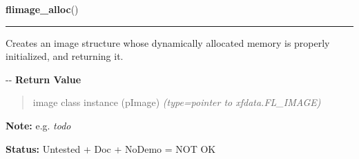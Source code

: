 \hspace{.8\funcindent}\begin{boxedminipage}{\funcwidth}

    \raggedright \textbf{flimage\_alloc}()

    \vspace{-1.5ex}

    \rule{\textwidth}{0.5\fboxrule}
\setlength{\parskip}{2ex}

Creates an image structure whose dynamically allocated memory is
properly initialized, and returning it.

-{}-
\setlength{\parskip}{1ex}
      \textbf{Return Value}
    \vspace{-1ex}

      \begin{quote}

image class instance (pImage)
      {\it (type=pointer to xfdata.FL\_IMAGE)}

      \end{quote}

\textbf{Note:} 
e.g. \emph{todo}


\textbf{Status:} 
Untested + Doc + NoDemo = NOT OK


    \end{boxedminipage}

    \label{xformslib:flflimage:flimage_getmem}

    \vspace{0.5ex}

